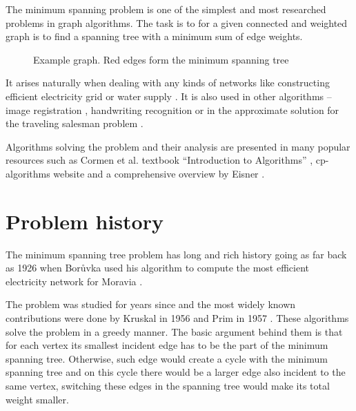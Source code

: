 The minimum spanning problem is one of the simplest and most researched problems in graph algorithms. The task is to for a given connected and weighted graph is to find a spanning tree with a minimum sum of edge weights.

\begin{figure}[ht!]
    \centering
    \caption{Example graph. Red edges form the minimum spanning tree}
    \label{fig:graph-1}
\end{figure}
\FloatBarrier

It arises naturally when dealing with any kinds of networks like constructing efficient electricity grid \cite{bor} or water supply \cite{water}. It is also used in other algorithms -- image registration \cite{image_registration}, handwriting recognition \cite{handwriting} or in the approximate solution for the traveling salesman problem \cite{salesman}.

Algorithms solving the problem and their analysis are presented in many popular resources such as Cormen et al. textbook ``Introduction to Algorithms'' \cite{cormen}, cp-algorithms website \cite{cpalgoPrim} and a comprehensive overview by Eisner \cite{eisner}.

\section{Problem history}
The minimum spanning tree problem has long and rich history going as far back as 1926 when Borůvka used his algorithm to compute the most efficient electricity network for Moravia \cite{bor}. 

The problem was studied for years since and the most widely known contributions were done by Kruskal in 1956 \cite{kruskal} and Prim in 1957 \cite{prim}. These algorithms solve the problem in a greedy manner. The basic argument behind them is that for each vertex its smallest incident edge has to be the part of the minimum spanning tree. Otherwise, such edge would create a cycle with the minimum spanning tree and on this cycle there would be a larger edge also incident to the same vertex, switching these edges in the spanning tree would make its total weight smaller.

